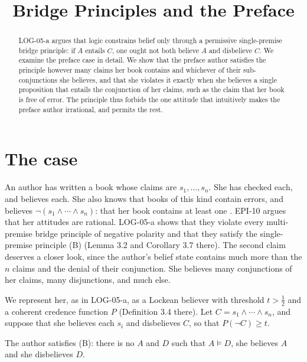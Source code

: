 \documentclass{situationist-preprint}
\title{Bridge Principles and the Preface}
\begin{document}
\maketitle

\begin{abstract}
LOG-05-a argues that logic constrains belief only through a permissive single-premise bridge principle: if $A$ entails $C$, one ought not both believe $A$ and disbelieve $C$. We examine the preface case in detail. We show that the preface author satisfies the principle however many claims her book contains and whichever of their sub-conjunctions she believes, and that she violates it exactly when she believes a single proposition that entails the conjunction of her claims, such as the claim that her book is free of error. The principle thus forbids the one attitude that intuitively makes the preface author irrational, and permits the rest.
\end{abstract}

\section{The case}

An author has written a book whose claims are $s_1, \ldots, s_n$. She has checked each, and believes each. She also knows that books of this kind contain errors, and believes $\neg(s_1 \wedge \cdots \wedge s_n)$: that her book contains at least one \citep{Makinson1965}. EPI-10 argues that her attitudes are rational. LOG-05-a shows that they violate every multi-premise bridge principle of negative polarity and that they satisfy the single-premise principle (B) (Lemma 3.2 and Corollary 3.7 there). The second claim deserves a closer look, since the author's belief state contains much more than the $n$ claims and the denial of their conjunction. She believes many conjunctions of her claims, many disjunctions, and much else.

We represent her, as in LOG-05-a, as a Lockean believer with threshold $t > \tfrac12$ and a coherent credence function $P$ (Definition 3.4 there). Let $C = s_1 \wedge \cdots \wedge s_n$, and suppose that she believes each $s_i$ and disbelieves $C$, so that $P(\neg C) \geq t$.

\begin{proposition}\label{p:safe}
The author satisfies (B): there is no $A$ and $D$ such that $A \models D$, she believes $A$ and she disbelieves $D$.
\end{proposition}
\end{document}
